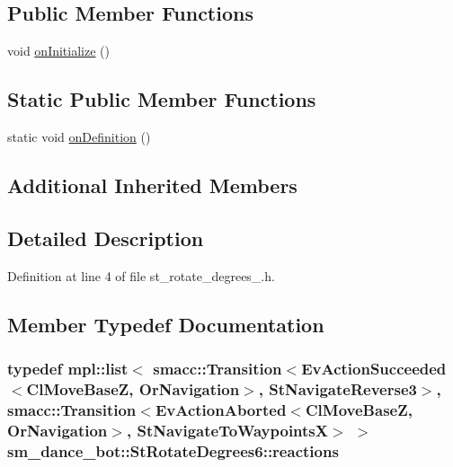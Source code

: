 \subsection*{Public Member Functions}
\begin{DoxyCompactItemize}
\item 
void \hyperlink{structsm__dance__bot_1_1StRotateDegrees6_ac6bbf8ae2f6d6696c7dee7a8846a8bff}{on\+Initialize} ()
\end{DoxyCompactItemize}
\subsection*{Static Public Member Functions}
\begin{DoxyCompactItemize}
\item 
static void \hyperlink{structsm__dance__bot_1_1StRotateDegrees6_a74c6db98216d664a2aeaa89a08a07600}{on\+Definition} ()
\end{DoxyCompactItemize}
\subsection*{Additional Inherited Members}


\subsection{Detailed Description}


Definition at line 4 of file st\+\_\+rotate\+\_\+degrees\+\_.\+h.



\subsection{Member Typedef Documentation}
\subsubsection[{\texorpdfstring{reactions}{reactions}}]{\setlength{\rightskip}{0pt plus 5cm}typedef mpl\+::list$<$ {\bf smacc\+::\+Transition}$<$Ev\+Action\+Succeeded$<${\bf Cl\+Move\+BaseZ}, {\bf Or\+Navigation}$>$, {\bf St\+Navigate\+Reverse3}$>$, {\bf smacc\+::\+Transition}$<$Ev\+Action\+Aborted$<${\bf Cl\+Move\+BaseZ}, {\bf Or\+Navigation}$>$, {\bf St\+Navigate\+To\+WaypointsX}$>$ $>$ {\bf sm\+\_\+dance\+\_\+bot\+::\+St\+Rotate\+Degrees6\+::reactions}}\hypertarget{structsm__dance__bot_1_1StRotateDegrees6_a103f6ea78ff4293a2d2c1086a391355d}{}\label{structsm__dance__bot_1_1StRotateDegrees6_a103f6ea78ff4293a2d2c1086a391355d}


